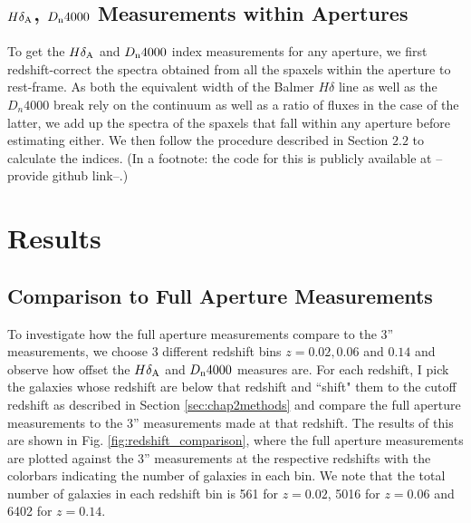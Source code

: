 \subsection{$H\delta_{\rm A}$, $D_{\rm n}4000$ Measurements within Apertures}
To get the $H\delta_{\rm A}$ and $D_{\rm n}4000$ index measurements for any aperture, we first redshift-correct the spectra obtained from all the spaxels within the aperture to rest-frame. As both the equivalent width of the Balmer $H\delta$ line as well as the $D_{n}4000$ break rely on the continuum as well as a ratio of fluxes in the case of the latter, we add up the spectra of the spaxels that fall within any aperture before estimating either. We then follow the procedure described in Section $2.2$ to calculate the indices. (In a footnote: the code for this is publicly available at --provide github link--.)

\section{Results}
\subsection{Comparison to Full Aperture Measurements}
To investigate how the full aperture measurements compare to the 3'' measurements, we choose 3 different redshift bins $z = 0.02,0.06$ and $0.14$ and observe how offset the $H\delta_{\rm A}$ and $D_{\rm n}4000$ measures are. For each redshift, I pick the galaxies whose redshift are below that redshift and ``shift" them to the cutoff redshift as described in Section \ref{sec:chap2methods} and compare the full aperture measurements to the 3'' measurements made at that redshift. The results of this are shown in Fig. \ref{fig:redshift_comparison}, where the full aperture measurements are plotted against the 3'' measurements at the respective redshifts with the colorbars indicating the number of galaxies in each bin. We note that the total number of galaxies in each redshift bin is 561 for $z = 0.02$, 5016 for $z = 0.06$ and 6402 for $z = 0.14$.\\

